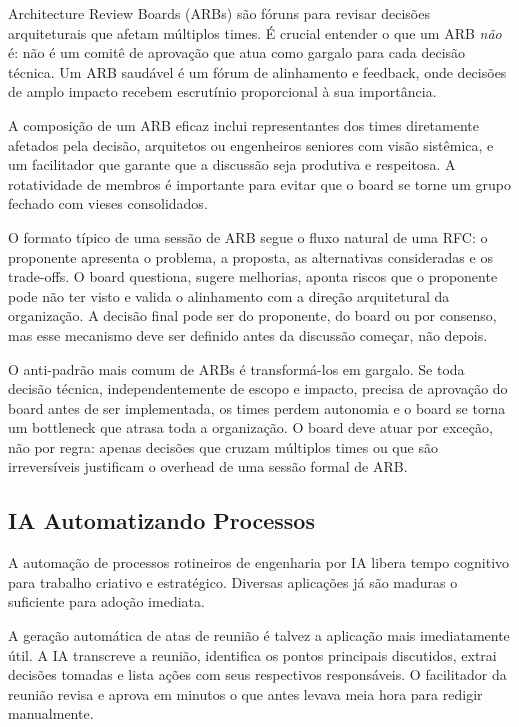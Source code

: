 Architecture Review Boards (ARBs) são fóruns para revisar decisões
arquiteturais que afetam múltiplos times. É crucial entender o que um ARB
\textit{não} é: não é um comitê de aprovação que atua como gargalo para cada
decisão técnica. Um ARB saudável é um fórum de alinhamento e feedback, onde
decisões de amplo impacto recebem escrutínio proporcional à sua importância.

A composição de um ARB eficaz inclui representantes dos times diretamente
afetados pela decisão, arquitetos ou engenheiros seniores com visão
sistêmica, e um facilitador que garante que a discussão seja produtiva e
respeitosa. A rotatividade de membros é importante para evitar que o board
se torne um grupo fechado com vieses consolidados.

O formato típico de uma sessão de ARB segue o fluxo natural de uma RFC: o
proponente apresenta o problema, a proposta, as alternativas consideradas e
os trade-offs. O board questiona, sugere melhorias, aponta riscos que o
proponente pode não ter visto e valida o alinhamento com a direção
arquitetural da organização. A decisão final pode ser do proponente, do
board ou por consenso, mas esse mecanismo deve ser definido antes da
discussão começar, não depois.

O anti-padrão mais comum de ARBs é transformá-los em gargalo. Se toda
decisão técnica, independentemente de escopo e impacto, precisa de
aprovação do board antes de ser implementada, os times perdem autonomia e o
board se torna um bottleneck que atrasa toda a organização. O board deve
atuar por exceção, não por regra: apenas decisões que cruzam múltiplos times
ou que são irreversíveis justificam o overhead de uma sessão formal de ARB.

\subsection{IA Automatizando Processos}

A automação de processos rotineiros de engenharia por IA libera tempo
cognitivo para trabalho criativo e estratégico. Diversas aplicações já são
maduras o suficiente para adoção imediata.

A geração automática de atas de reunião é talvez a aplicação mais
imediatamente útil. A IA transcreve a reunião, identifica os pontos
principais discutidos, extrai decisões tomadas e lista ações com seus
respectivos responsáveis. O facilitador da reunião revisa e aprova em
minutos o que antes levava meia hora para redigir manualmente.

